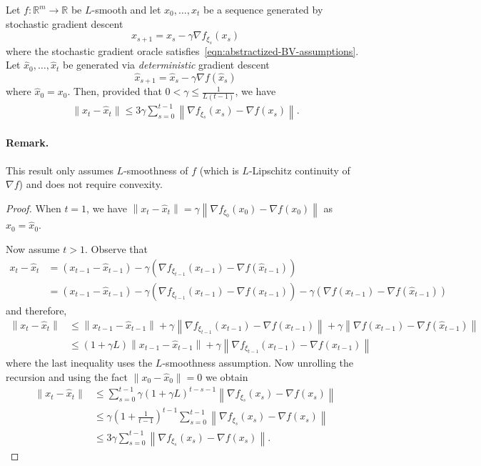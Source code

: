 \documentclass{article}
\newcommand{\reals}{\mathbb{R}}
\newcommand{\norm}[1]{\left\|#1\right\|}
\theoremstyle{plain}
\theoremstyle{remark}
\begin{document}
\begin{lemma}
\label{lemma:stochastic-gradient-descent-deterministic-sequence-difference-bound}
Let $f \colon \reals^m \to \reals$ be $L$-smooth and let $x_0,\dots,x_t$ be a sequence generated by stochastic gradient descent
\[
    x_{s+1} = x_s - \gamma \nabla f_{\xi_s} (x_s) 
\]
where the stochastic gradient oracle satisfies~\eqref{eqn:abstractized-BV-assumptions}.
Let $\hat{x}_0,\dots,\hat{x}_t$ be generated via \emph{deterministic} gradient descent
\[
    \hat{x}_{s+1} = \hat{x}_s - \gamma \nabla f(\hat{x}_s)
\]
where $\hat{x}_0 = x_0$. Then, provided that $0 < \gamma \le \frac{1}{L(t-1)}$, we have
\begin{align*}
    \norm{x_t - \hat{x}_t} \le 3\gamma \sum_{s=0}^{t-1}  \norm{\nabla f_{\xi_{s}} (x_{s}) - \nabla f(x_{s})} .
\end{align*}
\end{lemma}

\paragraph{Remark.}
This result only assumes $L$-smoothness of $f$ (which is $L$-Lipschitz continuity of $\nabla f$) and does not require convexity.

\begin{proof}
When $t=1$, we have $\norm{x_t - \hat{x}_t} = \gamma\norm{\nabla f_{\xi_0}(x_0) - \nabla f(x_0)}$ as $x_0 = \hat{x}_0$. 

Now assume $t>1$.
Observe that 
\begin{align*}
    x_t - \hat{x}_t & = (x_{t-1} - \hat{x}_{t-1}) - \gamma \left( \nabla f_{\xi_{t-1}} (x_{t-1}) - \nabla f(\hat{x}_{t-1}) \right) \\
    & = (x_{t-1} - \hat{x}_{t-1}) - \gamma \left( \nabla f_{\xi_{t-1}} (x_{t-1}) - \nabla f(x_{t-1}) \right) - \gamma \left( \nabla f(x_{t-1}) - \nabla f(\hat{x}_{t-1}) \right)
\end{align*}
and therefore,
\begin{align*}
    \norm{x_t - \hat{x}_t} & \le \norm{x_{t-1} - \hat{x}_{t-1}} + \gamma \norm{\nabla f_{\xi_{t-1}} (x_{t-1}) - \nabla f(x_{t-1})} + \gamma \norm{\nabla f(x_{t-1}) - \nabla f(\hat{x}_{t-1})} \\
    & \le (1 + \gamma L) \norm{x_{t-1} - \hat{x}_{t-1}} + \gamma \norm{\nabla f_{\xi_{t-1}} (x_{t-1}) - \nabla f(x_{t-1})} 
\end{align*}
where the last inequality uses the $L$-smoothness assumption.
Now unrolling the recursion and using the fact $\norm{x_0 - \hat{x}_0} = 0$ we obtain
\begin{align*}
    \norm{x_t - \hat{x}_t} & \le \sum_{s=0}^{t-1} \gamma (1+\gamma L)^{t-s-1} \norm{\nabla f_{\xi_{s}} (x_{s}) - \nabla f(x_{s})} \\
    & \le \gamma \left( 1 + \frac{1}{t-1} \right)^{t-1} \sum_{s=0}^{t-1}  \norm{\nabla f_{\xi_{s}} (x_{s}) - \nabla f(x_{s})} \\
    & \le 3\gamma \sum_{s=0}^{t-1}  \norm{\nabla f_{\xi_{s}} (x_{s}) - \nabla f(x_{s})} .
\end{align*}

\end{proof}
\end{document}
